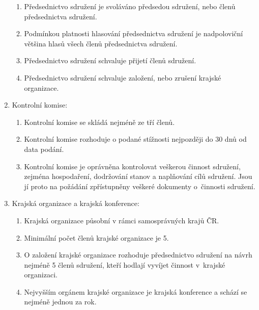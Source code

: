 \documentclass[a4paper]{article}
\begin{document}
\begin{enumerate}
\begin{enumerate}
        \item Předsednictvo sdružení je svoláváno předsedou sdružení, nebo
             členů předsednictva sdružení.

        \item Podmínkou platnosti hlasování předsednictva sdružení je
            nadpoloviční většina hlasů všech členů předsednictva sdružení.

        \item Předsednictvo sdružení schvaluje přijetí členů sdružení.

        \item Předsednictvo sdružení schvaluje založení, nebo zrušení krajské organizace.
        \end{enumerate}

    \item Kontrolní komise:
        \begin{enumerate}
        \item Kontrolní komise se skládá nejméně ze tří členů.

        \item Kontrolní komise rozhoduje o podané stížnosti nejpozději do
            30 dnů od data podání.

        \item Kontrolní komise je oprávněna kontrolovat veškerou činnost sdružení,
            zejména hospodaření, dodržování stanov a naplňování cílů sdružení.
            Jsou jí proto na požádání zpřístupněny veškeré dokumenty o~činnosti
            sdružení.
        \end{enumerate}

    \item Krajská organizace a krajská konference:
        \begin{enumerate}
        \item Krajská organizace působní v rámci samosprávných krajů ČR.

        \item Minimální počet členů krajské organizace je 5.

        \item O založení krajské organizace rozhoduje předsednictvo sdružení na
            návrh nejméně 5 členů sdružení, kteří hodlají vyvíjet činnost
            v~krajské organizaci.

        \item Nejvyšším orgánem krajské organizace je krajská konference a schází
            se nejméně jednou za rok.


\end{enumerate}
\end{enumerate}
\end{document}
